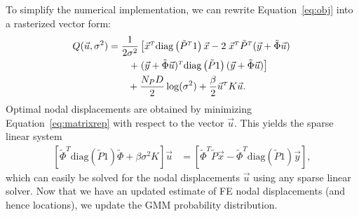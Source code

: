 \documentclass[journal]{IEEEtran}
\newcommand{\trans}[1]{#1^{\scriptscriptstyle T}}
\newcommand{\diag}{\mathrm{diag}}
\begin{document}
To simplify the numerical implementation, we can rewrite Equation~\eqref{eq:obj} into a rasterized vector form:
\begin{align}\label{eq:matrixrep}
    Q(\vec{u},\sigma^2) & = \dfrac{1}{2\sigma^2}\left[ \trans{\vec{x}}\diag\left(\trans{\tilde{P}}1\right)\vec{x} -2\;\trans{\vec{x}}\trans{\tilde{P}}(\vec{y}+\tilde{\Phi}\vec{u}) \right.\notag\\
    & \qquad \left. +\;\trans{(\vec{y}+\tilde{\Phi}\vec{u})}\diag\left(\tilde{P}1\right)(\vec{y}+\tilde{\Phi}\vec{u}) \right]\notag\\
    & \qquad + \dfrac{N_PD}{2}\log(\sigma^2) + \dfrac{\beta}{2}\trans{\vec{u}}K\vec{u}.
\end{align}
Optimal nodal displacements are obtained by minimizing Equation~\eqref{eq:matrixrep} with respect to the vector $\vec{u}$. This yields the sparse linear system
\begin{align}\label{eq:Mstep}
        \left[\trans{\tilde{\Phi}}\diag\!\left(\tilde{P}1\right)\tilde{\Phi} 
            + \beta \sigma^2K\right] \vec{u} & = \left[\trans{\tilde{\Phi}}\tilde{P}\vec{x}
            -\trans{\tilde{\Phi}}\diag\!\left(\tilde{P}1\right)\vec{y}\right],
\end{align}
which can easily be solved for the nodal displacements $\vec{u}$ using any sparse linear solver.  Now that we have an updated estimate of FE nodal displacements (and hence locations), we update the GMM probability distribution.  
\end{document}
